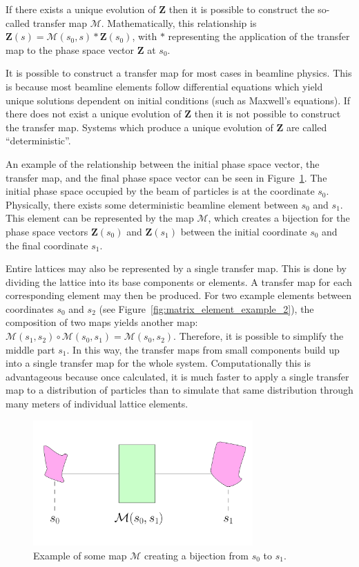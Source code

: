 If there exists a unique evolution of $\mathbf{Z}$ then it is possible to construct the so-called transfer map $\mathcal{M}$. Mathematically, this relationship is $\mathbf{Z}(s)=\mathcal{M}(s_0 , s)*\mathbf{Z}(s_0)$, with $*$ representing the application of the transfer map to the phase space vector $\mathbf{Z}$ at $s_0$. 

It is possible to construct a transfer map for most cases in beamline physics. This is because most beamline elements follow differential equations which yield unique solutions dependent on initial conditions (such as Maxwell's equations). If there does not exist a unique evolution of $\mathbf{Z}$ then it is not possible to construct the transfer map. Systems which produce a unique evolution of $\mathbf{Z}$ are called ``deterministic''.

An example of the relationship between the initial phase space vector, the transfer map, and the final phase space vector can be seen in Figure~\ref{fig:matrix_element_example_1}. The initial phase space occupied by the beam of particles is at the coordinate $s_0$. Physically, there exists some deterministic beamline element between $s_0$ and $s_1$. This element can be represented by the map $\mathcal{M}$, which creates a bijection for the phase space vectors $\mathbf{Z}(s_0)$ and $\mathbf{Z}(s_1)$ between the initial coordinate $s_0$ and the final coordinate $s_1$. 

Entire lattices may also be represented by a single transfer map. This is done by dividing the lattice into its base components or elements. A transfer map for each corresponding element may then be produced. For two example elements between coordinates $s_0$ and $s_2$ (see Figure~\ref{fig:matrix_element_example_2}), the composition of two maps yields another map: $\mathcal{M}(s_1 , s_2)\circ \mathcal{M}(s_0 , s_1) = \mathcal{M}(s_0 , s_2)$.  Therefore, it is possible to simplify the middle part $s_1$. In this way, the transfer maps from small components build up into a single transfer map for the whole system. Computationally this is advantageous because once calculated, it is much faster to apply a single transfer map to a distribution of particles than to simulate that same distribution through many meters of individual lattice elements.

\begin{figure}[h!]
  \centering
    \includegraphics[width=0.75\textwidth]{Figures/matrix_element_example_1} 
  \caption{Example of some map $\mathcal{M}$ creating a bijection from $s_0$ to $s_1$.}
  \label{fig:matrix_element_example_1}
\end{figure}

